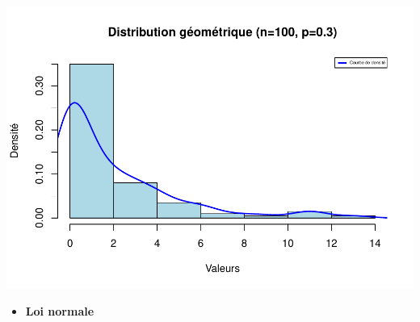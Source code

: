 \documentclass[
  12pt,
]{article}
\providecommand{\tightlist}{%
  \setlength{\itemsep}{0pt}\setlength{\parskip}{0pt}}
\begin{document}
\includegraphics{Stat_non_para_files/figure-latex/unnamed-chunk-7-1.pdf}

\begin{itemize}
\tightlist
\item
  \textbf{Loi normale}
\end{itemize}
\end{document}

